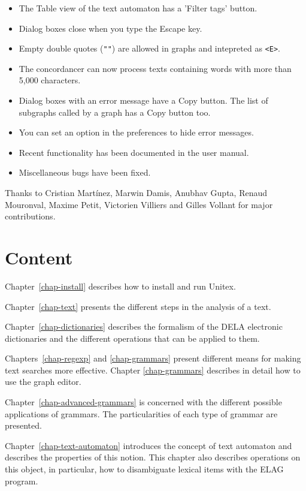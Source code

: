 \begin{itemize}
  \item The Table view of the text automaton has a 'Filter tags' button.
  \item Dialog boxes close when you type the Escape key.
  \item Empty double quotes (\verb$""$) are allowed in graphs and intepreted
  as \verb$<E>$.
  \item The concordancer can now process texts containing words with more than
   5,000  characters.
  \item Dialog boxes with an error message have a Copy button. The list of
  subgraphs called by a graph has a Copy button too.
  \item You can set an option in the preferences to hide error messages.
  \item Recent functionality has been documented in the user manual.
  \item Miscellaneous bugs have been fixed.
\end{itemize}

\noindent Thanks to Cristian Martínez, Marwin Damis, Anubhav Gupta, Renaud Mouronval,
Maxime Petit, Victorien Villiers and Gilles Vollant for major contributions.

\section*{Content}
\noindent Chapter~\ref{chap-install} describes how to install and run
Unitex.

\bigskip \noindent Chapter~\ref{chap-text} presents the different steps in the
analysis of  a text.

\bigskip \noindent Chapter~\ref{chap-dictionaries} describes the formalism of
the DELA electronic dictionaries and the different operations that can be applied to them.

\bigskip \noindent Chapters~\ref{chap-regexp} and \ref{chap-grammars}
present different means for making text searches more effective. 
Chapter \ref{chap-grammars} describes in detail how to use the graph
editor.

\bigskip \noindent Chapter~\ref{chap-advanced-grammars} is concerned
with the different possible applications of grammars. The particularities of each type of grammar are
presented.

\bigskip \noindent Chapter~\ref{chap-text-automaton} introduces the 
concept of text automaton and describes the properties of this notion. This chapter also describes 
operations on this object, in particular, how to disambiguate lexical items with
the ELAG program.

